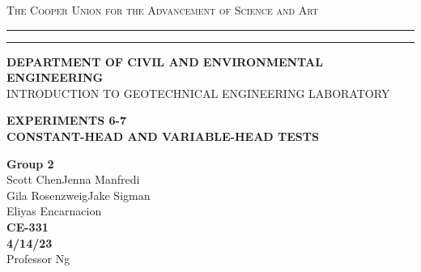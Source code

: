 \begin{titlepage}
    \begin{center}
    {{\Large{\textsc{The Cooper Union for the Advancement of Science and Art}}}} \rule[0.1cm]{15.8cm}{0.1mm}
    \rule[0.5cm]{15.8cm}{0.6mm}
    {\small{\bf DEPARTMENT OF CIVIL AND ENVIRONMENTAL ENGINEERING}}\\
    {\footnotesize{INTRODUCTION TO GEOTECHNICAL ENGINEERING LABORATORY}}
    \end{center}
    \vspace{15mm}
    \begin{center}
    {\large{\bf EXPERIMENTS 6-7\\}}
    \vspace{5mm}
    {\Large{\bf CONSTANT-HEAD AND VARIABLE-HEAD TESTS}}
    \end{center}
    \vspace{35mm}
    \par
    \noindent
    \hfill
    \vspace{20mm}
    \begin{center}
    {\large{\bf {Group 2\\}}}
    {\large{ { Scott Chen\hspace{5mm}Jenna Manfredi\\Gila Rosenzweig\hspace{5mm}Jake Sigman\\Eliyas Encarnacion}}}
    \vspace{40mm}
    {\large {\bf \\CE-331 \\ 4/14/23 \\}}
    \vspace{15mm}
    {\normalsize{Professor Ng}}
    \end{center}
\end{titlepage}
